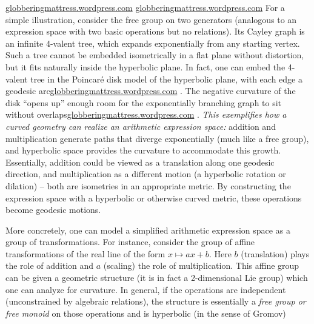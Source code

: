 \documentclass[11pt]{article}
\theoremstyle{remark}
\begin{document}
\href{https://globberingmattress.wordpress.com/2017/12/26/deck-transformations-revisted/#:~:text=are%20quite%20unnatural,means%20forgetting%20about%20the%20geometry}{globberingmattress.wordpress.com}
\href{https://globberingmattress.wordpress.com/2017/12/26/deck-transformations-revisted/#:~:text=Image%3A%20cayley_graph_of_f2}{globberingmattress.wordpress.com}
For a simple illustration, consider the free group on two generators (analogous to an expression space with two basic operations but no relations). Its Cayley graph is an infinite 4-valent tree, which expands exponentially from any starting vertex. Such a tree cannot be embedded isometrically in a flat plane without distortion, but it fits naturally inside the hyperbolic plane. In fact, one can embed the 4-valent tree in the Poincaré disk model of the hyperbolic plane, with each edge a geodesic arc\href{https://globberingmattress.wordpress.com/2017/12/26/deck-transformations-revisted/#:~:text=are%20quite%20unnatural,means%20forgetting%20about%20the%20geometry}{globberingmattress.wordpress.com}
. The negative curvature of the disk “opens up” enough room for the exponentially branching graph to sit without overlaps\href{https://globberingmattress.wordpress.com/2017/12/26/deck-transformations-revisted/#:~:text=Image%3A%20cayley_graph_of_f2}{globberingmattress.wordpress.com}
. \textit{This exemplifies how a curved geometry can realize an arithmetic expression space:} addition and multiplication generate paths that diverge exponentially (much like a free group), and hyperbolic space provides the curvature to accommodate this growth. Essentially, addition could be viewed as a translation along one geodesic direction, and multiplication as a different motion (a hyperbolic rotation or dilation) – both are isometries in an appropriate metric. By constructing the expression space with a hyperbolic or otherwise curved metric, these operations become geodesic motions.

More concretely, one can model a simplified arithmetic expression space as a group of transformations. For instance, consider the group of affine transformations of the real line of the form $x \mapsto ax+b$. Here $b$ (translation) plays the role of addition and $a$ (scaling) the role of multiplication. This affine group can be given a geometric structure (it is in fact a 2-dimensional Lie group) which one can analyze for curvature. In general, if the operations are independent (unconstrained by algebraic relations), the structure is essentially a \textit{free group or free monoid} on those operations and is hyperbolic (in the sense of Gromov)
\end{document}
